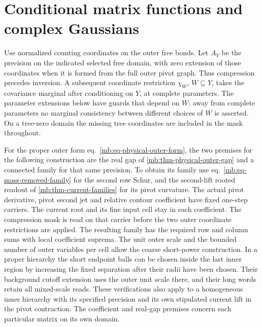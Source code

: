 \documentclass[11pt,letterpaper,reqno]{amsart}
\numberwithin{equation}{section}
\renewcommand{\eqref}[1]{\textup{eq.~\ref{#1}}}
\theoremstyle{definition}
\theoremstyle{remark}
\begin{document}
\section{Conditional matrix functions and complex Gaussians}
\label{mb:sec-conditional-matrix}

Use normalized counting coordinates on the outer free bonds. Let \(A_Y\) be the precision on the indicated selected free domain, with zero extension of those coordinates when it is formed from the full outer pivot graph. Thus compression precedes inversion. A subsequent coordinate restriction \(\chi_W\), \(W\subseteq Y\), takes the covariance marginal after conditioning on \(Y\), at complete parameters. The parameter extensions below have guards that depend on \(W\); away from complete parameters no marginal consistency between different choices of \(W\) is asserted. On a tree-zero domain the missing tree coordinates are included in the mask throughout.

For the proper outer form \eqref{mb:eq-physical-outer-form}, the two premises for the following construction are the real gap of \cref{mb:thm-physical-outer-gap} and a connected family for that same precision. To obtain its family use \eqref{mb:eq-mass-removed-family} for the second row Schur, and the second-lift rooted readout of \cref{mb:thm-current-families} for its pivot curvature. The actual pivot derivative, pivot second jet and relative contour coefficient have fixed one-step carriers. The current root and its fine input cell stay in each coefficient. The compression mask is read on that carrier before the two outer coordinate restrictions are applied. The resulting family has the required row and column sums with local coefficient suprema. The unit outer scale and the bounded number of outer variables per cell allow the coarse short-power construction. In a proper hierarchy the short endpoint balls can be chosen inside the last inner region by increasing the fixed separation after their radii have been chosen. Their background cutoff extension uses the outer unit scale there, and their long words retain all mixed-scale reads. These verifications also apply to a homogeneous inner hierarchy with its specified precision and its own stipulated current lift in the pivot contraction. The coefficient and real-gap premises concern each particular matrix on its own domain.
\end{document}
